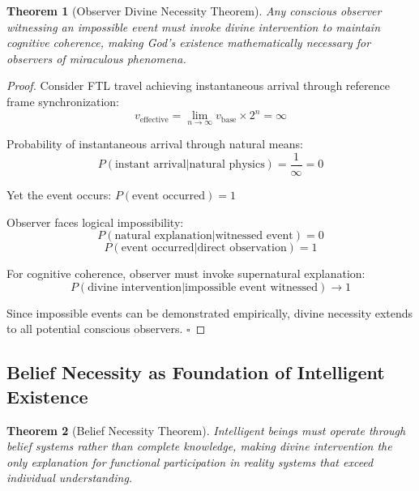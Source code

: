\documentclass[12pt,a4paper]{article}
\newtheorem{theorem}{Theorem}[section]
\begin{document}
\begin{theorem}[Observer Divine Necessity Theorem]
Any conscious observer witnessing an impossible event must invoke divine intervention to maintain cognitive coherence, making God's existence mathematically necessary for observers of miraculous phenomena.
\end{theorem}

\begin{proof}
Consider FTL travel achieving instantaneous arrival through reference frame synchronization:
$$v_{\text{effective}} = \lim_{n \to \infty} v_{\text{base}} \times 2^n = \infty$$

Probability of instantaneous arrival through natural means:
$$P(\text{instant arrival}|\text{natural physics}) = \frac{1}{\infty} = 0$$

Yet the event occurs: $P(\text{event occurred}) = 1$

Observer faces logical impossibility:
$$P(\text{natural explanation}|\text{witnessed event}) = 0$$
$$P(\text{event occurred}|\text{direct observation}) = 1$$

For cognitive coherence, observer must invoke supernatural explanation:
$$P(\text{divine intervention}|\text{impossible event witnessed}) \to 1$$

Since impossible events can be demonstrated empirically, divine necessity extends to all potential conscious observers. $\square$
\end{proof}

\subsection{Belief Necessity as Foundation of Intelligent Existence}

\begin{theorem}[Belief Necessity Theorem]
Intelligent beings must operate through belief systems rather than complete knowledge, making divine intervention the only explanation for functional participation in reality systems that exceed individual understanding.
\end{theorem}
\end{document}
